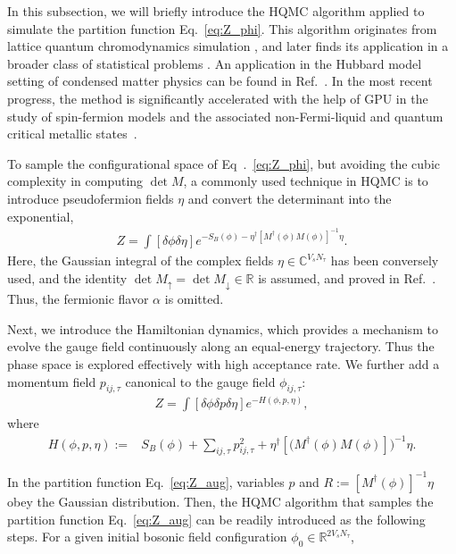 \documentclass[aps,prl,twocolumn,superscriptaddress,showpacs,longbibliography]{revtex4-2}
\newcommand{\leftr}{\left[}
\newcommand{\rightr}{\right]}
\begin{document}
\vspace{3mm}  

In this subsection, we will briefly introduce the HQMC algorithm applied to simulate the partition function Eq.~\eqref{eq:Z_phi}. This algorithm originates from lattice quantum chromodynamics simulation \cite{Duane1987}, and later finds its application in a broader class of statistical problems \cite{brooks2011handbook}. An application in the Hubbard model setting of condensed matter physics can be found in Ref.~\cite{Beyl2018}. In the most recent progress, the method is significantly accelerated with the help of GPU in the study of spin-fermion models and the associated non-Fermi-liquid and quantum critical metallic states~\cite{patel2024strange, lunts2023non}.


To sample the configurational space of Eq~.~\eqref{eq:Z_phi}, but avoiding the cubic complexity in computing $\operatorname{det}M$, a commonly used technique in HQMC is to introduce pseudofermion fields $\eta$ and convert the determinant into the exponential,
\begin{align}
Z=\int\left[\delta \phi \delta \eta \right] e^{-S_{B}(\phi)- \eta^{\dagger}\leftr M^{\dagger}(\phi) M(\phi)\rightr^{-1} \eta}.
\end{align}
Here, the Gaussian integral of the complex fields $\eta \in \mathbb{C}^{V_s N_\tau}$ has been conversely used, and the identity 
$\operatorname{det}M_\uparrow=\operatorname{det}M_\downarrow \in \mathbb{R}$ is assumed, and proved in Ref.~\cite{XYXuU12018}. Thus, the fermionic flavor $\alpha$ is omitted.

Next, we introduce the Hamiltonian dynamics, which provides a mechanism to evolve the gauge field continuously along an equal-energy trajectory. Thus the phase space is explored effectively with high acceptance rate. We further add a momentum field $p_{ij,\tau}$ canonical to the gauge field  $\phi_{ij,\tau}$:
\begin{align}
    Z=\int\left[\delta \phi \delta p \delta \eta \right] e^{- H \left(\phi, p, \eta \right)}, \label{eq:Z_aug}
\end{align}
where
\begin{align}
H \left(\phi, p, \eta \right):= & S_{B}(\phi)+\sum_{ij, \tau} p_{ij, \tau}^2 + \eta^{\dagger}\leftr (M^{\dagger}(\phi) M(\phi)\rightr )^{-1} \eta. \label{eq:H_hmc}
\end{align}

In the partition function Eq.~\eqref{eq:Z_aug}, variables $p$ and $R:=\left[M^{\dagger}(\phi)\right]^{-1} \eta$ obey the Gaussian distribution. Then, the HQMC algorithm that samples the partition function Eq.~\eqref{eq:Z_aug} can be readily introduced as the following steps. For a given initial bosonic field configuration $\phi_0 \in \mathbb{R}^{2V_sN_\tau}$, 
\end{document}
